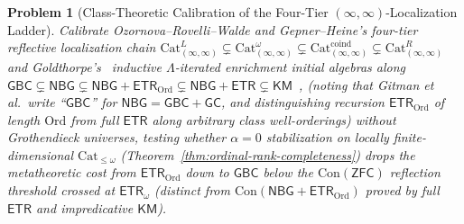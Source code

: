 \documentclass[10pt,twoside,openright]{book}
\theoremstyle{crmplain}
\newtheorem{problem}{Problem}[chapter]
\theoremstyle{crmdef}
\theoremstyle{crmremark}
\begin{document}
\begin{problem}[Class-Theoretic Calibration of the Four-Tier $(\infty, \infty)$-\allowbreak Localization Ladder]\label{prob:open-16}
Calibrate Ozornova--Rovelli--Walde and Gepner--Heine's four-tier reflective localization chain $\mathrm{Cat}^L_{(\infty,\infty)} \subsetneq\allowbreak \mathrm{Cat}^\omega_{(\infty,\infty)} \subsetneq\allowbreak \mathrm{Cat}^{\mathrm{coind}}_{(\infty,\infty)} \subsetneq\allowbreak \mathrm{Cat}^R_{(\infty,\infty)}$ \cite{ORW26,GepnerHeine26} and Goldthorpe's~\cite{Goldthorpe23} inductive $\Lambda$-iterated enrichment initial algebras along $\mathsf{GBC} \subsetneq\allowbreak \mathsf{NBG} \subsetneq\allowbreak \mathsf{NBG}+\mathsf{ETR}_{\mathrm{Ord}} \subsetneq\allowbreak \mathsf{NBG}+\mathsf{ETR} \subsetneq\allowbreak \mathsf{KM}$~\cite[Thm.~1.2]{Gitman20}, \cite{Williams18} (noting that Gitman et al.\ write ``$\mathsf{GBC}$'' for $\mathsf{NBG} = \mathsf{GBC} + \mathsf{GC}$, and distinguishing recursion $\mathsf{ETR}_{\mathrm{Ord}}$ of length $\mathrm{Ord}$ from full $\mathsf{ETR}$ along arbitrary class well-orderings) without Grothendieck universes, testing whether $\alpha = 0$ stabilization on locally finite-dimensional $\mathrm{Cat}_{\le \omega}$ (Theorem~\ref{thm:ordinal-rank-completeness}) drops the metatheoretic cost from $\mathsf{ETR}_{\mathrm{Ord}}$ down to $\mathsf{GBC}$ below the $\mathrm{Con}(\mathsf{ZFC})$ reflection threshold crossed at $\mathsf{ETR}_\omega$ (distinct from $\mathrm{Con}(\mathsf{NBG}+\mathsf{ETR}_{\mathrm{Ord}})$ proved by full $\mathsf{ETR}$ and impredicative $\mathsf{KM}$).
\end{problem}
\end{document}
